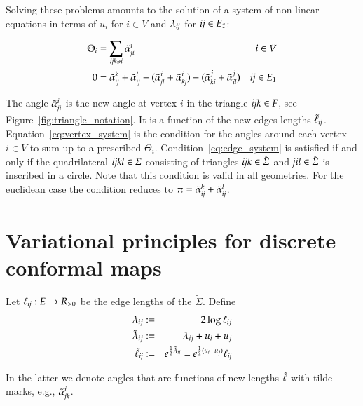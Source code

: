 \documentclass[Thesis]{subfiles}
\begin{document}
Solving these problems amounts to the solution of a system of non-linear equations in terms of $u_i$ for $i\in V$ and $\lambda_{\it ij}$ for $\it ij \in E_1$:

\begin{align}
	\Theta_i &=\sum_{\it ijk \ni i}\tilde{\alpha}_{\it ji}^i & i\in V\label{eq:vertex_system}\\
	0 &= \tilde{\alpha}_{\it ij}^k + \tilde{\alpha}_{\it ij}^l - (\tilde{\alpha}^i_{\it jl} + \tilde{\alpha}^i_{\it kj}) - (\tilde{\alpha}^j_{\it ki} + \tilde{\alpha}^j_{\it il}) & \textit{ij} \in E_1\label{eq:edge_system}
\end{align}

The angle $\tilde{\alpha}_{\it ji}^i$ is the new angle at vertex $i$ in the triangle $\it ijk\in F$, see Figure~\ref{fig:triangle_notation}.
It is a function of the new edges lengths $\tilde\ell_{\it ij}$.
Equation~\ref{eq:vertex_system} is the condition for the angles around each vertex $i \in V$ to sum up to a prescribed $\Theta_i$.
Condition~\ref{eq:edge_system} is satisfied if and only if the quadrilateral $\it ijkl\in \Sigma$ consisting of triangles $\it ijk\in \tilde \Sigma$ and $\it jil\in \tilde \Sigma$ is inscribed in a circle. Note that this condition is valid in all geometries. For the euclidean case the condition reduces to $\pi=\tilde{\alpha}_{\it ij}^k + \tilde{\alpha}_{\it ij}^l$.

\section{Variational principles for discrete conformal maps}
\label{sec:vari-princ}

\begin{definition}
Let $\ell_{\it ij}:E\to R_{>0}$ be the edge lengths of the $\tilde \Sigma$. Define
\begin{eqnarray*}
\lambda_{ij} &:=& 2\log \ell_{ij}\label{eq:lambda_def}\\
\tilde\lambda_{ij} &:=& \lambda_{ij}+u_i+u_j\\
\tilde \ell_{\it ij} &:=& e^{\frac{1}{2}\tilde \lambda_{\it ij}}=e^{\frac{1}{2}(u_i + u_j)}\ell_{\it ij}
\end{eqnarray*}
\end{definition}
In the latter we denote angles that are functions of new lengths $\tilde{\ell}$ with tilde marks, e.g., $\tilde{\alpha}_{\it jk}^i$.
\end{document}
